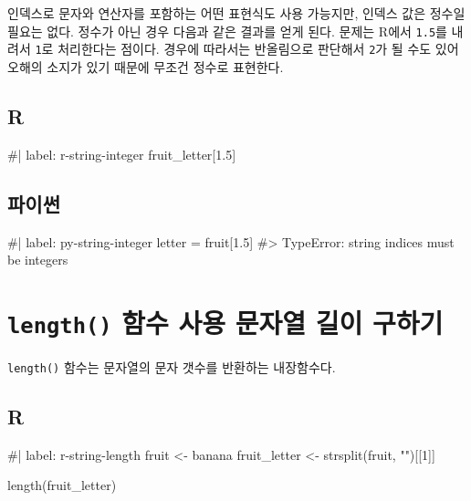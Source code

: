 \documentclass[
  letterpaper,
]{book}
\newenvironment{Shaded}{\begin{snugshade}}{\end{snugshade}}
\newcommand{\NormalTok}[1]{\textcolor[rgb]{0.00,0.23,0.31}{#1}}
\begin{document}
인덱스로 문자와 연산자를 포함하는 어떤 표현식도 사용 가능지만, 인덱스
값은 정수일 필요는 없다. 정수가 아닌 경우 다음과 같은 결과를 얻게 된다.
문제는 R에서 \texttt{1.5}를 내려서 \texttt{1}로 처리한다는 점이다.
경우에 따라서는 반올림으로 판단해서 \texttt{2}가 될 수도 있어 오해의
소지가 있기 때문에 무조건 정수로 표현한다. 
 

\subsection{R}

\begin{Shaded}
\begin{Highlighting}[]
\NormalTok{\#| label: r{-}string{-}integer}
\NormalTok{fruit\_letter[1.5]}
\end{Highlighting}
\end{Shaded}

\subsection{파이썬}

\begin{Shaded}
\begin{Highlighting}[]
\NormalTok{\#| label: py{-}string{-}integer}
\NormalTok{letter = fruit[1.5]}
\NormalTok{\#\textgreater{} TypeError: string indices must be integers}
\end{Highlighting}
\end{Shaded}

\section{\texorpdfstring{\texttt{length()} 함수 사용 문자열 길이
구하기}{length() 함수 사용 문자열 길이 구하기}}\label{r-string-length}

\texttt{length()} 함수는 문자열의 문자 갯수를 반환하는 내장함수다.
 

\subsection{R}

\begin{Shaded}
\begin{Highlighting}[]
\NormalTok{\#| label: r{-}string{-}length}
\NormalTok{fruit \textless{}{-} \textquotesingle{}banana\textquotesingle{}}
\NormalTok{fruit\_letter \textless{}{-} strsplit(fruit, "")[[1]]}

\NormalTok{length(fruit\_letter)}
\end{Highlighting}
\end{Shaded}
\end{document}
